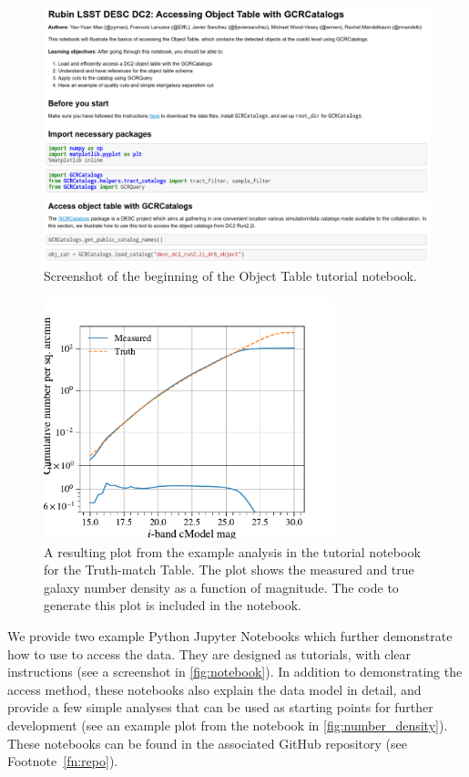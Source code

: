 \documentclass[modern]{descnote}
\begin{document}
\begin{figure}[tbh!]
    \centering
    \includegraphics[width=\textwidth]{figs/notebook.png}
    \caption{Screenshot of the beginning of the Object Table tutorial notebook.}
    \label{fig:notebook}
\end{figure}
\begin{figure}[tbh!]
    \centering
    \includegraphics[width=0.75\textwidth]{figs/number_density.pdf}
    \caption{A resulting plot from the example analysis in the tutorial notebook for the Truth-match Table. The plot shows the measured and true galaxy number density as a function of magnitude. The code to generate this plot is included in the notebook.}
    \label{fig:number_density}
\end{figure}

We provide two example Python Jupyter Notebooks which further demonstrate how to use  to access the data.
They are designed as tutorials, with clear instructions (see a screenshot in \autoref{fig:notebook}). In addition to demonstrating the access method, these notebooks also explain the data model in detail, and provide a few simple analyses that can be used as starting points for further development (see an example plot from the notebook in \autoref{fig:number_density}).
These notebooks can be found in the associated GitHub repository (see Footnote~\ref{fn:repo}).
\end{document}
